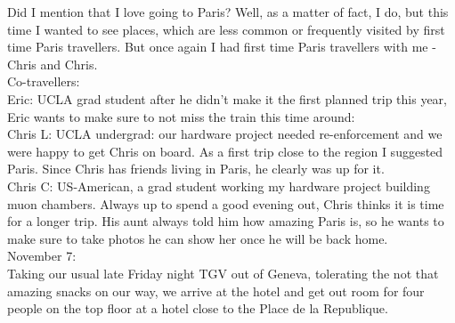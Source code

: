 Did I mention that I love going to Paris? Well, as a matter of fact, I do, but this time I wanted to see places, which are less common or frequently visited by first time Paris travellers. But once again I had first time Paris travellers with me - Chris and Chris.\\

Co-travellers:\\
Eric: UCLA grad student after he didn't make it the first planned trip this year, Eric wants to make sure to not miss the train this time around:\\
Chris L: UCLA undergrad: our hardware project needed re-enforcement and we were happy to get Chris on board. As a first trip close to the region I suggested Paris. Since Chris has friends living in Paris, he clearly was up for it.\\
Chris C: US-American, a grad student working my hardware project building muon chambers. Always up to spend a good evening out, Chris thinks it is time for a longer trip. His aunt always told him how amazing Paris is, so he wants to make sure to take photos he can show her once he will be back home.\\

November 7:\\
Taking our usual late Friday night TGV out of Geneva, tolerating the not that amazing snacks on our way, we arrive at the hotel and get out room for four people on the top floor at a hotel close to the Place de la Republique.\\

